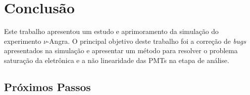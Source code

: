 \chapter{Conclusão} \label{cap:conclusao}
\vspace{-2cm}

Este trabalho apresentou um estudo e aprimoramento da simulação do experimento $\nu$-Angra. O principal objetivo deste trabalho foi a correção de \emph{bugs} apresentados na simulação e apresentar um método para resolver o problema saturação da eletrônica e a não linearidade das PMTs na etapa de análise. 

\section{Próximos Passos}


